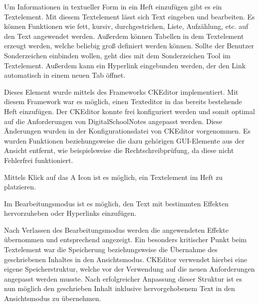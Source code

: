Um Informationen in textueller Form in ein Heft einzufügen gibt es ein Textelement. Mit diesem Textelement lässt sich Text eingeben und bearbeiten. Es können Funktionen wie fett, kursiv, durchgestrichen, Liste, Aufzählung, etc. auf den Text angewendet werden. Außerdem können Tabellen in dem Textelement erzeugt werden, welche beliebig groß definiert werden können. Sollte der Benutzer Sonderzeichen einbinden wollen, geht dies mit dem Sonderzeichen Tool im Textelement. Außerdem kann ein Hyperlink eingebunden werden, der den Link automatisch in einem neuen Tab öffnet.

Dieses Element wurde mittels des Frameworks CKEditor implementiert. Mit diesem Framework war es möglich, einen Texteditor in das bereits bestehende Heft einzufügen. Der CKEditor konnte frei konfiguriert werden und somit optimal auf die Anforderungen von DigitalSchoolNotes angepasst werden. Diese Änderungen wurden in der Konfigurationsdatei von CKEditor vorgenommen. Es wurden Funktionen beziehungsweise die dazu gehörigen GUI-Elemente aus der Ansicht entfernt, wie beispielsweise die Rechtschreibprüfung, da diese nicht Fehlerfrei funktioniert.\cite{CKEDITOR}

Mittels Klick auf das A Icon ist es möglich, ein Textelement im Heft zu platzieren.

Im Bearbeitungsmodus ist es möglich, den Text mit bestimmten Effekten hervorzuheben oder Hyperlinks einzufügen.

Nach Verlassen des Bearbeitungsmodus werden die angewendeten Effekte übernommen und entsprechend angezeigt.
Ein besonders kritischer Punkt beim Textelement war die Speicherung beziehungsweise die Übernahme des geschriebenen Inhaltes in den Ansichtsmodus. CKEditor verwendet hierbei eine eigene Speicherstruktur, welche vor der Verwendung auf die neuen Anforderungen angepasst werden musste. Nach erfolgreicher Anpassung dieser Struktur ist es nun möglich den geschrieben Inhalt inklusive hervorgehobenem Text in den Ansichtsmodus zu übernehmen.


